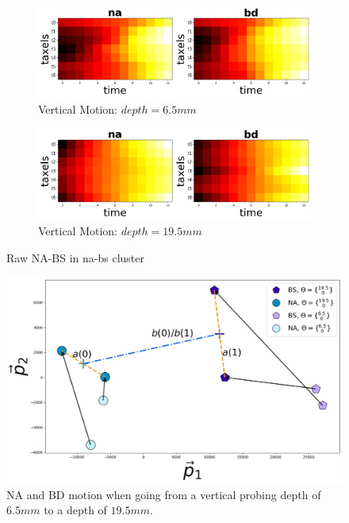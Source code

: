 \documentclass[]{interact}
\theoremstyle{plain}%
\theoremstyle{definition}
\theoremstyle{remark}
\begin{document}
\begin{minipage}{\textwidth}
	\begin{figure}[H]
		\centering
		\begin{subfigure}[b]{.43\textwidth}
			\includegraphics[width=\textwidth]{./figs/nabd_rawdataf_Vertical-d6_5.jpg}
			\caption{Vertical Motion: $depth=6.5mm$}
			\label{rawnabs:d6_5}
		\end{subfigure}
		\hspace{0.02\textwidth}
		\begin{subfigure}[b]{.43\textwidth}
			\includegraphics[width=\textwidth]{./figs/nabd_rawdataf_Vertical-d19_5.jpg}
			\caption{Vertical Motion: $depth=19.5mm$}
			\label{rawnabs:d19_5}
		\end{subfigure}
		\caption{Raw NA-BS in na-bs cluster}
		\label{rawnabs}
	\end{figure}
	\begin{figure}[H]
		\centering
		\includegraphics[width=.8\textwidth]{./figs/flow.jpg}\hspace{0.07\textwidth}
		\caption{NA and BD motion when going from a vertical probing depth of $6.5mm$ to a depth of $19.5mm$.}
		\label{flow}
	\end{figure}
\hfill\\
\end{minipage}
\end{document}
